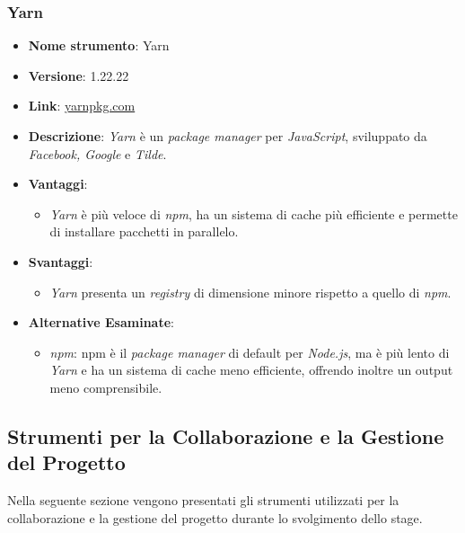 \subsubsection{Yarn}
\begin{itemize}
      \item \textbf{Nome strumento}: Yarn
      \item \textbf{Versione}: 1.22.22
      \item \textbf{Link}: \href{https://yarnpkg.com/}{yarnpkg.com}
      \item \textbf{Descrizione}: \textit{Yarn} è un \textit{package manager} per \textit{JavaScript}, sviluppato da \textit{Facebook, Google} e \textit{Tilde}.
      \item \textbf{Vantaggi}:
            \begin{itemize}
                  \item \textit{Yarn} è più veloce di \textit{npm}, ha un sistema di cache più efficiente e permette di installare pacchetti in parallelo.
            \end{itemize}
      \item \textbf{Svantaggi}:
            \begin{itemize}
                  \item \textit{Yarn} presenta un \textit{registry} di dimensione minore rispetto a quello di \textit{npm}.
            \end{itemize}
      \item \textbf{Alternative Esaminate}:
            \begin{itemize}
                  \item \textit{npm}: npm è il \textit{package manager} di default per \textit{Node.js}, ma è più lento di \textit{Yarn} e ha un sistema di cache meno efficiente,
                        offrendo inoltre un output meno comprensibile.
            \end{itemize}
\end{itemize}

\subsection{Strumenti per la Collaborazione e la Gestione del Progetto}
Nella seguente sezione vengono presentati gli strumenti utilizzati per la collaborazione e la gestione del progetto durante lo svolgimento dello stage.

